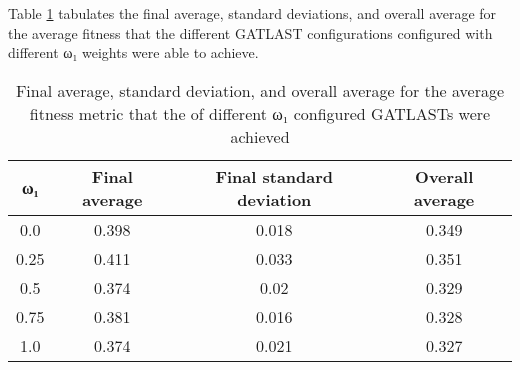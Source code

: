 Table \ref{tab:HP:GA:LTLWeight:average fitness} tabulates the final average, standard deviations, and overall average for the average fitness that the different GATLAST configurations configured with different ω₁ weights were able to achieve.
\begin{table}[tbh!]
\centering
\begin{adjustbox}{trim=0cm 0cm 0cm 0cm, clip=true}
\begin{tabular}{|c|c|c|c|}
\hline
ω₁ & Final average & Final standard deviation & Overall average\\
\hline
0.0 & 0.398 & 0.018 & 0.349\\\hline
0.25 & 0.411 & 0.033 & 0.351\\\hline
0.5 & 0.374 & 0.02 & 0.329\\\hline
0.75 & 0.381 & 0.016 & 0.328\\\hline
1.0 & 0.374 & 0.021 & 0.327\\\hline
\end{tabular}
\end{adjustbox}
\caption{Final average, standard deviation, and overall average for the average fitness metric that the of different ω₁ configured GATLASTs were achieved}
\label{tab:HP:GA:LTLWeight:average fitness}
\end{table}
